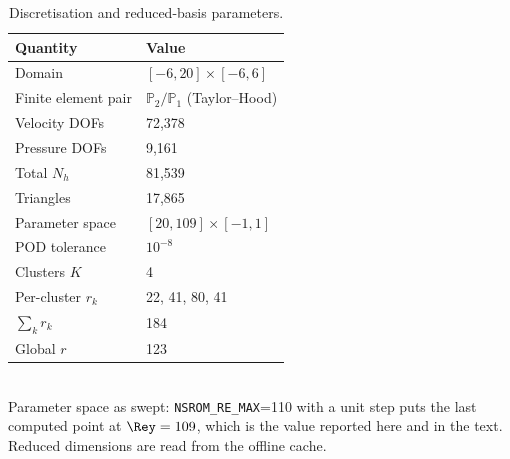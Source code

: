 \begin{table}[tb]
  \centering
  \caption{Discretisation and reduced-basis parameters.}
  \label{tab:params}
  \begin{tabular}{ll}
    \toprule
    Quantity & Value \\
    \midrule
    Domain & $[-6, 20]\times[-6, 6]$ \\
    Finite element pair & $\mathbb{P}_2/\mathbb{P}_1$ (Taylor--Hood) \\
    Velocity DOFs & 72{,}378 \\
    Pressure DOFs & 9{,}161 \\
    Total $N_h$ & 81{,}539 \\
    Triangles & 17{,}865 \\
    Parameter space & $[20,109]\times[-1,1]$ \\
    POD tolerance & $10^{-8}$ \\
    Clusters $K$ & 4 \\
    Per-cluster $r_k$ & 22, 41, 80, 41 \\
    $\sum_k r_k$ & 184 \\
    Global $r$ & 123 \\
    \bottomrule
  \end{tabular}
  \\[2pt] \footnotesize Parameter space as swept: \texttt{NSROM\_RE\_MAX}=110 with a unit step puts the last computed point at $\Rey=109$, which is the value reported here and in the text. Reduced dimensions are read from the offline cache.
\end{table}
